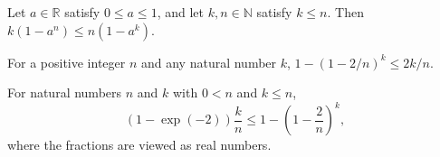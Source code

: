 \begin{theorem}
\label{FABL.natCast_mul_one_sub_pow_le}
\leanok
{}
Let $a\in\mathbb{R}$ satisfy $0\le a\le1$, and let $k,n\in\mathbb{N}$ satisfy $k\le n$.
Then $k(1-a^n)\le n(1-a^k)$.
\end{theorem}

\begin{theorem}
\label{FABL.one_sub_inverse_dimension_pow_upper}
\leanok
{}
For a positive integer $n$ and any natural number $k$, $1-(1-2/n)^k\le 2k/n$.
\end{theorem}

\begin{theorem}
\label{FABL.one_sub_inverse_dimension_pow_lower}
\leanok
{}
For natural numbers $n$ and $k$ with $0<n$ and $k\le n$, \[ (1-\exp(-2))\frac{k}{n} \le
1-\left(1-\frac{2}{n}\right)^k, \] where the fractions are viewed as real numbers.
\end{theorem}

